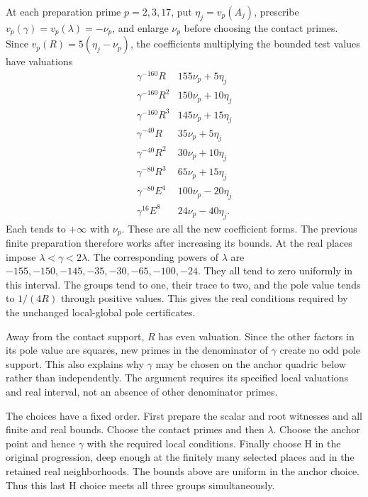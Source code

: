At each preparation prime $p=2,3,17$, put
$\eta_j=v_p(A_j)$, prescribe $v_p(\gamma)=v_p(\lambda)=-\nu_p$,
and enlarge $\nu_p$ before choosing the contact primes.
Since $v_p(R)=5(\eta_j-\nu_p)$, the coefficients multiplying
the bounded test values have valuations
\[
\begin{array}{c|c}
 \gamma^{-160}R&155\nu_p+5\eta_j\\
 \gamma^{-160}R^2&150\nu_p+10\eta_j\\
 \gamma^{-160}R^3&145\nu_p+15\eta_j\\
 \gamma^{-40}R&35\nu_p+5\eta_j\\
 \gamma^{-40}R^2&30\nu_p+10\eta_j\\
 \gamma^{-80}R^3&65\nu_p+15\eta_j\\
 \gamma^{-80}E^4&100\nu_p-20\eta_j\\
 \gamma^{16}E^8&24\nu_p-40\eta_j .
\end{array}
\]
Each tends to $+\infty$ with $\nu_p$. These are all the new
coefficient forms. The previous finite preparation therefore
works after increasing its bounds.
At the real places impose $\lambda<\gamma<2\lambda$.
The corresponding powers of $\lambda$ are
$-155,-150,-145,-35,-30,-65,-100,-24$.
They all tend to zero uniformly in this interval. The groups
tend to one, their trace to two, and the pole value tends to
$1/(4R)$ through positive values. This gives the real conditions
required by the unchanged local-global pole certificates.

Away from the contact support, $R$ has even valuation. Since
the other factors in its pole value are squares, new primes in
the denominator of $\gamma$ create no odd pole support.
This also explains why $\gamma$ may be chosen on the anchor
quadric below rather than independently. The argument requires
its specified local valuations and real interval, not an
absence of other denominator primes.

The choices have a fixed order. First prepare the scalar and
root witnesses and all finite and real bounds. Choose the
contact primes and then $\lambda$. Choose the anchor point
and hence $\gamma$ with the required local conditions.
Finally choose H in the original progression, deep enough at
the finitely many selected places and in the retained real
neighborhoods. The bounds above are uniform in the anchor
choice. Thus this last H choice meets all three groups
simultaneously.

